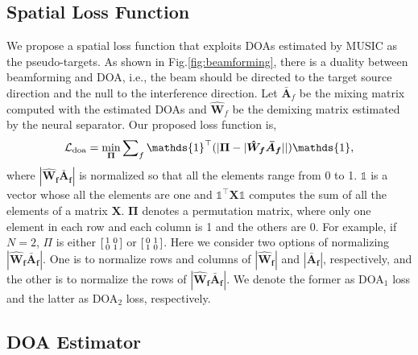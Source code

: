\documentclass[a4paper]{article}
\begin{document}
\subsection{Spatial Loss Function}
\label{subsec:spatial_loss}
We propose a spatial loss function that exploits DOAs estimated by MUSIC as the pseudo-targets.
As shown in Fig.\ref{fig:beamforming}, there is a duality between beamforming and DOA, i.e., the beam should be directed to the target source direction and the null to the interference direction.
Let $\bm{\bar{A}}_{f}$ be the mixing matrix computed with the estimated DOAs and $\bm{\hat{W}}_{f}$ be the demixing matrix estimated by the neural separator.
Our proposed loss function is,
\begin{align}
  \label{eqn:doa_loss_matrix}
    \mathcal{L}_{\rm{doa}} = \min_{\bm{\Pi}} \sum\nolimits_{f} \mathds{1}^\top (|\bm{\Pi} - |\bm{\hat{W}_{f}}\bm{\bar{A}_{f}}||)\mathds{1},
\end{align}
where $|\bm{\hat{W}_{f}}\bm{\bar{A}_{f}}|$ is normalized so that all the elements range from 0 to 1.
$\mathds{1}$ is a vector whose all the elements are one and $\mathds{1}^\top \bm{X} \mathds{1}$ computes the sum of all the elements of a matrix $\bm{X}$.
$\bm{\Pi}$ denotes a permutation matrix, where only one element in each row and each column is 1 and the others are 0.
For example, if $N=2$, $\Pi$ is either $\smqty[1 & 0 \\ 0 & 1]$ or $\smqty[0 & 1 \\ 1 & 0]$.
Here we consider two options of normalizing $|\bm{\hat{W}_{f}}\bm{\bar{A}_{f}}|$.
One is to normalize rows and columns of $|\bm{\hat{W}_{f}}|$ and $|\bm{\bar{A}_{f}}|$, respectively, and the other is to normalize the rows of $|\bm{\hat{W}_{f}}\bm{\bar{A}_{f}}|$.
We denote the former as DOA$_1$ loss and the latter as DOA$_2$ loss, respectively.


\subsection{DOA Estimator}
\label{subsec:prop_doa_estimation}
\end{document}
